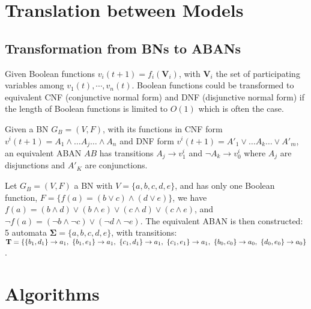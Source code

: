 \chapter{Translation between Models}
\section{Transformation from BNs to ABANs}\label{appendix:trans}

Given Boolean functions $v_i(t+1)=f_i(\mathbf{V}_i)$, with $\mathbf{V}_i$ the set of participating variables among $v_1(t),\cdots,v_n(t)$.
Boolean functions could be transformed to equivalent CNF (conjunctive normal form) and DNF (disjunctive normal form) if the length of Boolean functions is limited to $O(1)$ \cite{miltersen2005converting} which is often the case.
\begin{proposition}
Given a BN $G_B=(V,F)$, with its functions in CNF form $v^i(t+1)=A_1\land\ldots A_j \ldots\land A_n$ and DNF form $v^i(t+1)=A'_1\lor\ldots A_k\ldots\lor A'_m$, an equivalent ABAN $AB$ has transitions $A_j\to v^i_1$ and $\lnot A_k\to v^i_0$ where $A_j$ are disjunctions and $A'_K$ are conjunctions.
\end{proposition}
\begin{example}
Let $G_B=(V,F)$ a BN with $V=\{a,b,c,d,e\}$, and has only one Boolean function, $F=\{f(a)= (b\lor c)\land(d\lor e)\}$, we have 
$f(a)=(b\land d)\lor(b\land e)\lor(c\land d)\lor(c\land e)$, and $\lnot f(a)=(\lnot b\land \lnot c)\lor(\lnot d\land \lnot e)$. 
The equivalent ABAN is then constructed: 5 automata $\mathbf{\Sigma}=\{a,b,c,d,e\}$, with transitions: $\mathbf{T}=\{\acm{b_1,d_1}{a_0}{a_1},\ \acm{b_1,e_1}{a_0}{a_1},\ \acm{c_1,d_1}{a_0}{a_1},\ \acm{c_1,e_1}{a_0}{a_1},\ \acm{b_0,c_0}{a_1}{a_0},\ \acm{d_0,e_0}{a_1}{a_0}\}$.
\end{example}
\chapter{Algorithms}


